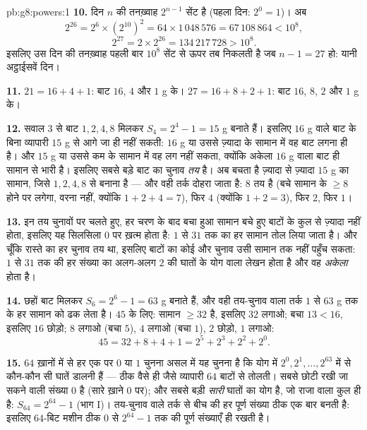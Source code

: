 \begin{solution}{pb:g8:powers:1}
\textbf{10.} दिन $n$ की तनख़्वाह $2^{n-1}$ सेंट है (पहला दिन:
$2^0 = 1$)। अब
\[
2^{26} = 2^6 \times \left(2^{10}\right)^2
= 64 \times 1\,048\,576 = 67\,108\,864 < 10^8,
\]
\[
2^{27} = 2 \times 2^{26} = 134\,217\,728 > 10^8 .
\]
इसलिए उस दिन की तनख़्वाह पहली बार $10^8$ सेंट से ऊपर तब निकलती है
जब $n - 1 = 27$ हो: यानी अट्ठाईसवें दिन।

\textbf{11.} $21 = 16 + 4 + 1$: बाट $16$, $4$ और $1$ g के।
$27 = 16 + 8 + 2 + 1$: बाट $16$, $8$, $2$ और $1$ g के।

\textbf{12.} सवाल 3 से बाट $1, 2, 4, 8$ मिलकर
$S_4 = 2^4 - 1 = 15$ g बनाते हैं। इसलिए $16$ g वाले बाट के बिना
व्यापारी $15$ g से आगे जा ही नहीं सकती: $16$ g या उससे ज़्यादा के
सामान में वह बाट लगना ही है। और $15$ g या उससे कम के सामान में वह
लग नहीं सकता, क्योंकि अकेला $16$ g वाला बाट ही सामान से भारी है।
इसलिए सबसे बड़े बाट का चुनाव \emph{तय} है। अब बचता है ज़्यादा से
ज़्यादा $15$ g का सामान, जिसे $1, 2, 4, 8$ से बनाना है --- और वही
तर्क दोहरा जाता है: $8$ तय है (बचे सामान के $\geq 8$ होने पर लगेगा,
वरना नहीं, क्योंकि $1 + 2 + 4 = 7$), फिर $4$ (क्योंकि
$1 + 2 = 3$), फिर $2$, फिर $1$।

\textbf{13.} इन तय चुनावों पर चलते हुए, हर चरण के बाद बचा हुआ
सामान बचे हुए बाटों के कुल से ज़्यादा नहीं होता, इसलिए यह सिलसिला
 $0$ पर ख़त्म होता है: $1$ से $31$ तक का हर सामान तोल लिया
जाता है। और चूँकि रास्ते का हर चुनाव तय था, इसलिए बाटों का कोई और
चुनाव उसी सामान तक नहीं पहुँच सकता: $1$ से $31$ तक की हर संख्या का
अलग-अलग $2$ की घातों के योग वाला लेखन होता है और वह \emph{अकेला}
होता है।

\textbf{14.} छहों बाट मिलकर $S_6 = 2^6 - 1 = 63$ g बनाते हैं, और
वही तय-चुनाव वाला तर्क $1$ से $63$ g तक के हर सामान को ढक लेता है।
$45$ के लिए: सामान $\geq 32$ है, इसलिए $32$ लगाओ; बचा $13 < 16$,
इसलिए $16$ छोड़ो; $8$ लगाओ (बचा $5$), $4$ लगाओ (बचा $1$), $2$
छोड़ो, $1$ लगाओ:
\[
45 = 32 + 8 + 4 + 1 = 2^5 + 2^3 + 2^2 + 2^0 .
\]

\textbf{15.} $64$ ख़ानों में से हर एक पर $0$ या $1$ चुनना असल में
यह चुनना है कि योग में $2^0, 2^1, \dots, 2^{63}$ में से कौन-कौन सी
घातें डालनी हैं --- ठीक वैसे ही जैसे व्यापारी $64$ बाटों से तोलती।
सबसे छोटी रखी जा सकने वाली संख्या $0$ है (सारे ख़ाने $0$ पर); और
सबसे बड़ी \emph{सारी} घातों का योग है, जो राजा वाला कुल ही है:
$S_{64} = 2^{64} - 1$ (भाग I)। तय-चुनाव वाले तर्क से बीच की हर
पूर्ण संख्या ठीक एक बार बनती है: इसलिए $64$-बिट मशीन ठीक $0$ से
$2^{64} - 1$ तक की पूर्ण संख्याएँ ही रखती है।

\end{solution}
